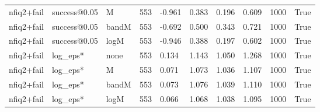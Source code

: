 \begin{tabular}{llllllllll}
nfiq2+fail & success@0.05 & M & 553 & -0.961 & 0.383 & 0.196 & 0.609 & 1000 & True \\
nfiq2+fail & success@0.05 & bandM & 553 & -0.692 & 0.500 & 0.343 & 0.721 & 1000 & True \\
nfiq2+fail & success@0.05 & logM & 553 & -0.946 & 0.388 & 0.197 & 0.602 & 1000 & True \\
nfiq2+fail & log\_eps* & none & 553 & 0.134 & 1.143 & 1.050 & 1.268 & 1000 & True \\
nfiq2+fail & log\_eps* & M & 553 & 0.071 & 1.073 & 1.036 & 1.107 & 1000 & True \\
nfiq2+fail & log\_eps* & bandM & 553 & 0.073 & 1.076 & 1.039 & 1.110 & 1000 & True \\
nfiq2+fail & log\_eps* & logM & 553 & 0.066 & 1.068 & 1.038 & 1.095 & 1000 & True \\
\hline
\end{tabular}
